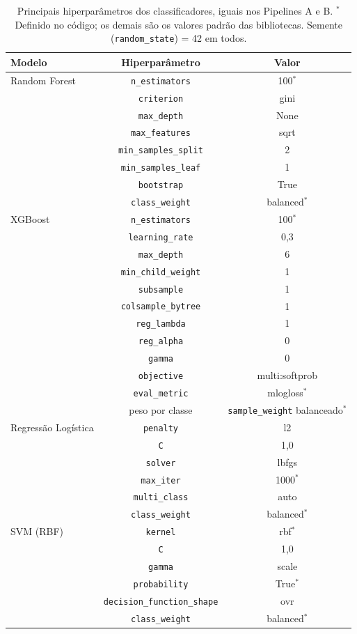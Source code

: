 \begin{table}[htbp]
  \centering
  \caption{Principais hiperparâmetros dos classificadores, iguais nos Pipelines A e B. $^{*}$Definido no código; os demais são os valores padrão das bibliotecas. Semente (\texttt{random\_state}) = 42 em todos.}
  \label{tab:hiperparametros}
  \begin{tabular}{lcc}
    \toprule
    Modelo & Hiperparâmetro & Valor \\
    \midrule
    Random Forest & \texttt{n\_estimators} & 100$^{*}$ \\
     & \texttt{criterion} & gini \\
     & \texttt{max\_depth} & None \\
     & \texttt{max\_features} & sqrt \\
     & \texttt{min\_samples\_split} & 2 \\
     & \texttt{min\_samples\_leaf} & 1 \\
     & \texttt{bootstrap} & True \\
     & \texttt{class\_weight} & balanced$^{*}$ \\
    XGBoost & \texttt{n\_estimators} & 100$^{*}$ \\
     & \texttt{learning\_rate} & 0,3 \\
     & \texttt{max\_depth} & 6 \\
     & \texttt{min\_child\_weight} & 1 \\
     & \texttt{subsample} & 1 \\
     & \texttt{colsample\_bytree} & 1 \\
     & \texttt{reg\_lambda} & 1 \\
     & \texttt{reg\_alpha} & 0 \\
     & \texttt{gamma} & 0 \\
     & \texttt{objective} & multi:softprob \\
     & \texttt{eval\_metric} & mlogloss$^{*}$ \\
     & peso por classe & \texttt{sample\_weight} balanceado$^{*}$ \\
    Regressão Logística & \texttt{penalty} & l2 \\
     & \texttt{C} & 1,0 \\
     & \texttt{solver} & lbfgs \\
     & \texttt{max\_iter} & 1000$^{*}$ \\
     & \texttt{multi\_class} & auto \\
     & \texttt{class\_weight} & balanced$^{*}$ \\
    SVM (RBF) & \texttt{kernel} & rbf$^{*}$ \\
     & \texttt{C} & 1,0 \\
     & \texttt{gamma} & scale \\
     & \texttt{probability} & True$^{*}$ \\
     & \texttt{decision\_function\_shape} & ovr \\
     & \texttt{class\_weight} & balanced$^{*}$ \\
    \bottomrule
  \end{tabular}
\end{table}
